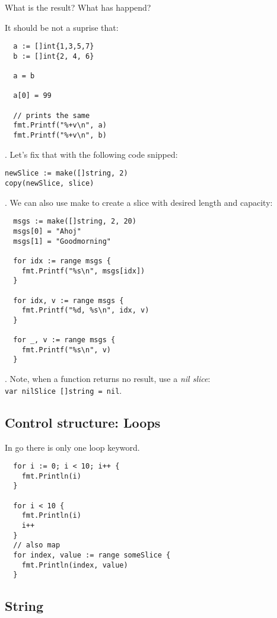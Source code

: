 \documentclass[11pt, letterpaper]{article}
\begin{document}
What is the result? What has happend?

\bigskip
\bigskip
\bigskip
It should be not a suprise that: 

\begin{verbatim}
  a := []int{1,3,5,7}
  b := []int{2, 4, 6}

  a = b

  a[0] = 99

  // prints the same
  fmt.Printf("%+v\n", a)
  fmt.Printf("%+v\n", b)
\end{verbatim}

. Let's fix that with the following code snipped:

\begin{verbatim}
newSlice := make([]string, 2)
copy(newSlice, slice)
\end{verbatim}

. We can also use make to create a slice with desired length and capacity:

\begin{verbatim}
  msgs := make([]string, 2, 20)
  msgs[0] = "Ahoj"
  msgs[1] = "Goodmorning"

  for idx := range msgs {
    fmt.Printf("%s\n", msgs[idx])
  }

  for idx, v := range msgs {
    fmt.Printf("%d, %s\n", idx, v)
  }

  for _, v := range msgs {
    fmt.Printf("%s\n", v)
  }
\end{verbatim}

. Note, when a function returns no result, use a \emph{nil slice}:\\ \texttt{var nilSlice []string = nil}.

\subsection{Control structure: Loops}

In go there is only one loop keyword.

\begin{verbatim}
  for i := 0; i < 10; i++ {
    fmt.Println(i)
  }

  for i < 10 {
    fmt.Println(i)
    i++
  }
  // also map
  for index, value := range someSlice {
    fmt.Println(index, value)
  }
\end{verbatim}

\subsection{String}
\end{document}
